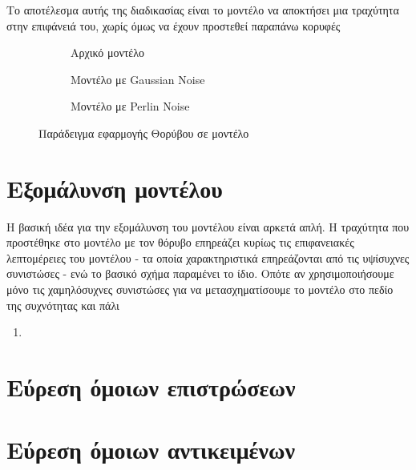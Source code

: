 \documentclass{article}
\begin{document}
Το αποτέλεσμα αυτής της διαδικασίας είναι το μοντέλο να αποκτήσει μια τραχύτητα στην
επιφάνειά του, χωρίς όμως να έχουν προστεθεί παραπάνω κορυφές

\begin{figure}[h]
	\begin{subfigure}{0.5\textwidth}
		\caption{Αρχικό μοντέλο}
	\end{subfigure}
	\begin{subfigure}{0.5\textwidth}
		\caption{Μοντέλο με Gaussian Noise}
	\end{subfigure}
	\begin{subfigure}{0.5\textwidth}
		\caption{Μοντέλο με Perlin Noise}
	\end{subfigure}
	\caption{Παράδειγμα εφαρμογής Θορύβου σε μοντέλο}
\end{figure}

\section{Εξομάλυνση μοντέλου}
Η βασική ιδέα για την εξομάλυνση του μοντέλου είναι αρκετά απλή. Η τραχύτητα που
προστέθηκε στο μοντέλο με τον θόρυβο επηρεάζει κυρίως τις επιφανειακές λεπτομέρειες
του μοντέλου - τα οποία χαρακτηριστικά επηρεάζονται από τις υψίσυχνες συνιστώσες -
ενώ το βασικό σχήμα παραμένει το ίδιο. Οπότε αν χρησιμοποιήσουμε μόνο τις
χαμηλόσυχνες συνιστώσες για να μετασχηματίσουμε το μοντέλο στο πεδίο της συχνότητας και
πάλι

\begin{enumerate}
	\item
\end{enumerate}


\section{Εύρεση όμοιων επιστρώσεων}


\section{Εύρεση όμοιων αντικειμένων}

\end{document}
